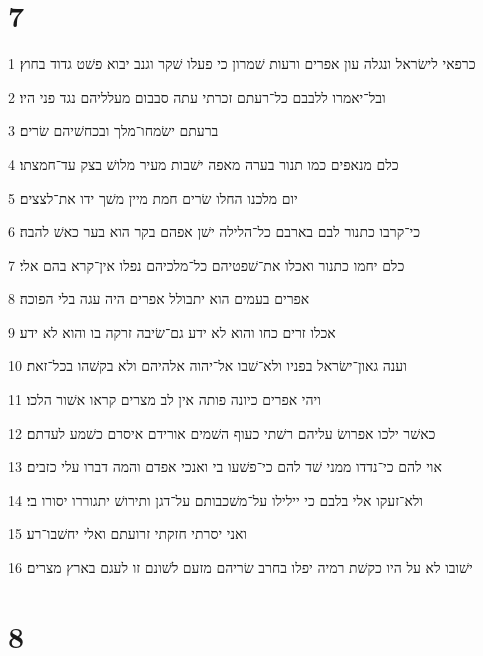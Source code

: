 \chapter{7}

\par 1 כרפאי לישׂראל ונגלה עון אפרים ורעות שׁמרון כי פעלו שׁקר וגנב יבוא פשׁט גדוד בחוץ׃
\par 2 ובל־יאמרו ללבבם כל־רעתם זכרתי עתה סבבום מעלליהם נגד פני היו׃
\par 3 ברעתם ישׂמחו־מלך ובכחשׁיהם שׂרים׃
\par 4 כלם מנאפים כמו תנור בערה מאפה ישׁבות מעיר מלושׁ בצק עד־חמצתו׃
\par 5 יום מלכנו החלו שׂרים חמת מיין משׁך ידו את־לצצים׃
\par 6 כי־קרבו כתנור לבם בארבם כל־הלילה ישׁן אפהם בקר הוא בער כאשׁ להבה׃
\par 7 כלם יחמו כתנור ואכלו את־שׁפטיהם כל־מלכיהם נפלו אין־קרא בהם אלי׃
\par 8 אפרים בעמים הוא יתבולל אפרים היה עגה בלי הפוכה׃
\par 9 אכלו זרים כחו והוא לא ידע גם־שׂיבה זרקה בו והוא לא ידע׃
\par 10 וענה גאון־ישׂראל בפניו ולא־שׁבו אל־יהוה אלהיהם ולא בקשׁהו בכל־זאת׃
\par 11 ויהי אפרים כיונה פותה אין לב מצרים קראו אשׁור הלכו׃
\par 12 כאשׁר ילכו אפרושׂ עליהם רשׁתי כעוף השׁמים אורידם איסרם כשׁמע לעדתם׃
\par 13 אוי להם כי־נדדו ממני שׁד להם כי־פשׁעו בי ואנכי אפדם והמה דברו עלי כזבים׃
\par 14 ולא־זעקו אלי בלבם כי יילילו על־משׁכבותם על־דגן ותירושׁ יתגוררו יסורו בי׃
\par 15 ואני יסרתי חזקתי זרועתם ואלי יחשׁבו־רע׃
\par 16 ישׁובו לא על היו כקשׁת רמיה יפלו בחרב שׂריהם מזעם לשׁונם זו לעגם בארץ מצרים׃

\chapter{8}

